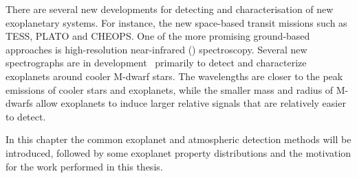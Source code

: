 There are several new developments for detecting and characterisation of new exoplanetary systems. For instance, the new space-based transit missions such as {TESS}, {PLATO} and {CHEOPS}.
One of the more promising ground-based approaches is high-resolution near-infrared (\nir{}) spectroscopy.
Several new \nir{} spectrographs are in development~\citep[e.g.][]{wright_third_2017} primarily to detect and characterize exoplanets around cooler {M-dwarf} stars. The \nir{} wavelengths are closer to the peak emissions of cooler stars and exoplanets, while the smaller mass and radius of {M-dwarfs} allow exoplanets to induce larger relative signals that are relatively easier to detect.

In this chapter the common exoplanet and atmospheric detection methods will be introduced, followed by some exoplanet property distributions and the motivation for the work performed in this thesis.










